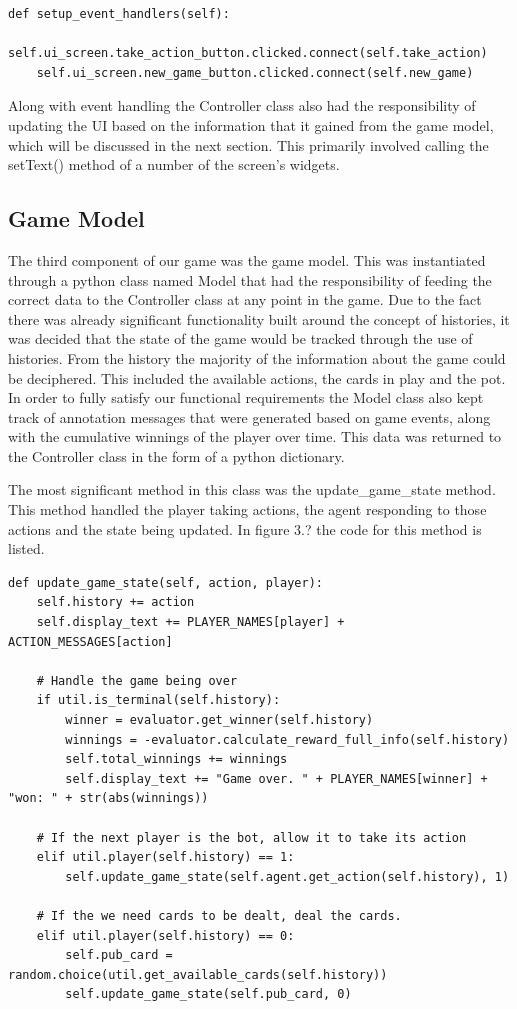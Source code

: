 \begin{lstlisting}[style=Python]
def setup_event_handlers(self):
    self.ui_screen.take_action_button.clicked.connect(self.take_action)
    self.ui_screen.new_game_button.clicked.connect(self.new_game)
\end{lstlisting}

Along with event handling the Controller class also had the responsibility of updating the
UI based on the information that it gained from the game model, which will be discussed in the next section.
This primarily involved calling the setText() method of a number of the screen's widgets.

\subsection{Game Model}\label{subsec:gameModel}
The third component of our game was the game model.
This was instantiated through a python class named Model that had the responsibility of feeding
the correct data to the Controller class at any point in the game.
Due to the fact there was already significant functionality built around the concept of histories,
it was decided that the state of the game would be tracked through the use of histories.
From the history the majority of the information about the game could be deciphered.
This included the available actions, the cards in play and the pot.
In order to fully satisfy our functional requirements the Model class also kept track of annotation messages
that were generated based on game events, along with the cumulative winnings of the player over time.
This data was returned to the Controller class in the
form of a python dictionary.

The most significant method in this class was the update\_game\_state method.
This method handled the player taking actions, the agent responding to those actions and the state being
updated.
In figure 3.? the code for this method is listed.

\begin{lstlisting}[style=Python]
def update_game_state(self, action, player):
    self.history += action
    self.display_text += PLAYER_NAMES[player] + ACTION_MESSAGES[action]

    # Handle the game being over
    if util.is_terminal(self.history):
        winner = evaluator.get_winner(self.history)
        winnings = -evaluator.calculate_reward_full_info(self.history)
        self.total_winnings += winnings
        self.display_text += "Game over. " + PLAYER_NAMES[winner] + "won: " + str(abs(winnings))

    # If the next player is the bot, allow it to take its action
    elif util.player(self.history) == 1:
        self.update_game_state(self.agent.get_action(self.history), 1)

    # If the we need cards to be dealt, deal the cards.
    elif util.player(self.history) == 0:
        self.pub_card = random.choice(util.get_available_cards(self.history))
        self.update_game_state(self.pub_card, 0)
\end{lstlisting}

